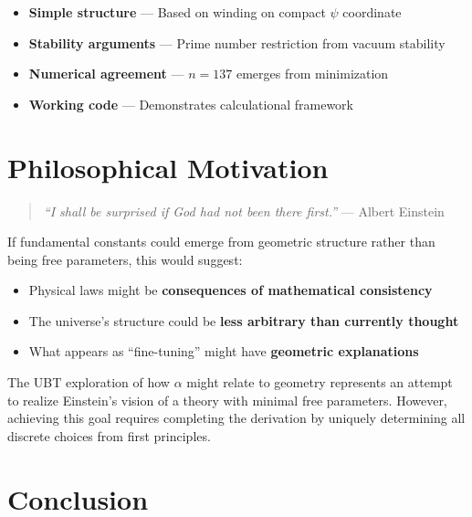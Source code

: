 \documentclass[12pt, a4paper]{article}
\begin{document}
\begin{itemize}
\item \textbf{Simple structure} — Based on winding on compact $\psi$ coordinate
\item \textbf{Stability arguments} — Prime number restriction from vacuum stability
\item \textbf{Numerical agreement} — $n=137$ emerges from minimization
\item \textbf{Working code} — Demonstrates calculational framework
\end{itemize}

\section{Philosophical Motivation}

\begin{quote}
\emph{``I shall be surprised if God had not been there first.''} — Albert Einstein
\end{quote}

If fundamental constants could emerge from geometric structure rather than being free parameters, this would suggest:

\begin{itemize}
\item Physical laws might be \textbf{consequences of mathematical consistency}
\item The universe's structure could be \textbf{less arbitrary than currently thought}
\item What appears as ``fine-tuning'' might have \textbf{geometric explanations}
\end{itemize}

The UBT exploration of how $\alpha$ might relate to geometry represents an attempt to realize Einstein's vision of a theory with minimal free parameters. However, achieving this goal requires completing the derivation by uniquely determining all discrete choices from first principles.

\section{Conclusion}

\begin{center}
\end{center}
\end{document}
